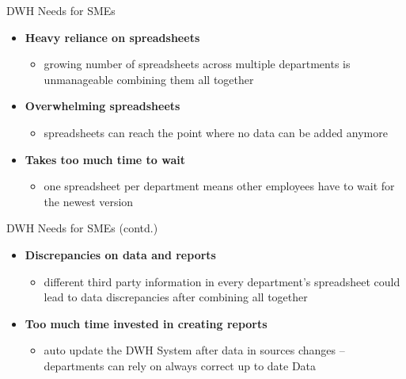 \documentclass[aspectratio=169]{beamer}
\begin{document}
  \begin{frame}{DWH Needs for SMEs}
    \begin{itemize}
      \item \textbf{Heavy reliance on spreadsheets}
      	\begin{itemize}
      	   \item growing number of spreadsheets across multiple departments is unmanageable combining them all together
      	\end{itemize}
      \item \textbf{Overwhelming spreadsheets}
		\begin{itemize}
		   \item spreadsheets can reach the point where no data can be added anymore
      	\end{itemize}
      \item \textbf{Takes too much time to wait}
      	\begin{itemize}
      	   \item one spreadsheet per department means other employees have to wait for the newest version
      	\end{itemize}
    \end{itemize}
  \end{frame}

  \begin{frame}{DWH Needs for SMEs (contd.)}
    \begin{itemize}
      \item \textbf{Discrepancies on data and reports}
      	\begin{itemize}
      	   \item different third party information in every department's spreadsheet could lead to data discrepancies after combining all together
      	\end{itemize}
      \item \textbf{Too much time invested in creating reports}
        \begin{itemize}
      	   \item auto update the DWH System after data in sources changes – departments can rely on always correct up to date Data
      	\end{itemize}
    \end{itemize}
  \end{frame}
\end{document}
